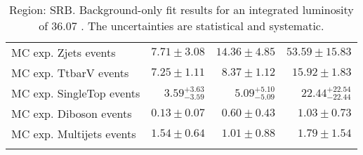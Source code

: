 \begin{table}
\begin{center}
{\begin{tabular*}{\textwidth}{@{\extracolsep{\fill}}lrrr}
        MC exp. Zjets events         & $7.71 \pm 3.08$          & $14.36 \pm 4.85$          & $53.59 \pm 15.83$              \\
        MC exp. TtbarV events         & $7.25 \pm 1.11$          & $8.37 \pm 1.12$          & $15.92 \pm 1.83$              \\
        MC exp. SingleTop events         & $3.59_{-3.59}^{+3.63}$          & $5.09_{-5.09}^{+5.10}$          & $22.44_{-22.44}^{+22.54}$              \\
        MC exp. Diboson events         & $0.13 \pm 0.07$          & $0.60 \pm 0.43$          & $1.03 \pm 0.73$              \\
        MC exp. Multijets events         & $1.54 \pm 0.64$          & $1.01 \pm 0.88$          & $1.79 \pm 1.54$              \\
\noalign{\smallskip}\hline\noalign{\smallskip}
\end{tabular*}
}
\end{center}
\caption{Region: SRB. Background-only fit results for an integrated luminosity of 36.07 \ifb. The uncertainties are statistical and systematic.
}
\label{table.bkgonly.SRB}
\end{table}
%